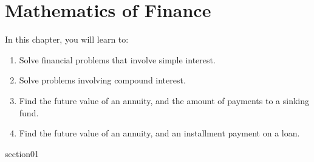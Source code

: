\chapter{Mathematics of Finance}

In this chapter, you will learn to:
\begin{enumerate}
    \item Solve financial problems that involve simple interest.
    \item Solve problems involving compound interest.
    \item Find the future value of an annuity, and the amount of payments to a sinking fund.
    \item Find the future value of an annuity, and an installment payment on a loan.
\end{enumerate}


{section01}

